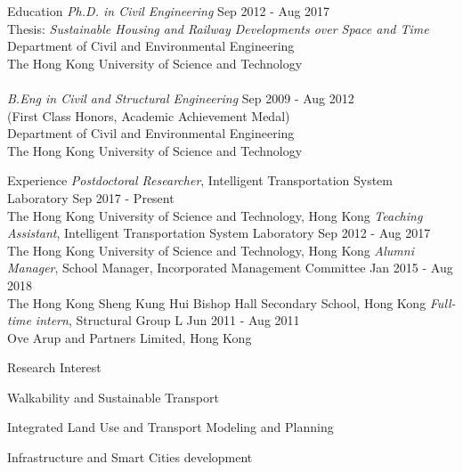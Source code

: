 \documentclass{resume} %
\begin{document}
\begin{rSection}{Education}
\textit{Ph.D. in Civil Engineering} \hfill {Sep 2012 - Aug 2017}\\
Thesis: \textit{Sustainable Housing and Railway Developments over Space and Time}
\smallskip \\
Department of Civil and Environmental Engineering \\
The Hong Kong University of Science and Technology \\
\\
\textit{B.Eng in Civil and Structural Engineering} \hfill
{Sep 2009 - Aug 2012}\\
(First Class Honors, Academic Achievement Medal)\smallskip \\
Department of Civil and Environmental Engineering \\
The Hong Kong University of Science and Technology
\end{rSection}

\begin{rSection}{Experience}
\textit{Postdoctoral Researcher}{, Intelligent Transportation System Laboratory} \hfill {Sep 2017 -
Present}\\
The Hong Kong University of Science and Technology, Hong Kong\smallskip
\textit{Teaching Assistant}{, Intelligent Transportation System Laboratory} \hfill {Sep 2012 - Aug
2017}\\
The Hong Kong University of Science and Technology, Hong Kong\smallskip
\textit{Alumni Manager}{, School Manager, Incorporated Management Committee} \hfill {Jan
2015 - Aug 2018}\\
The Hong Kong Sheng Kung Hui Bishop Hall Secondary School, Hong Kong\smallskip
\textit{Full-time intern}{, Structural Group L} \hfill {Jun 2011 - Aug 2011}\\
Ove Arup and Partners Limited, Hong Kong\smallskip
\end{rSection}

\begin{rSection}{Research Interest}
\itemsep -5pt
\item Walkability and Sustainable Transport
\item Integrated Land Use and Transport Modeling and Planning
\item Infrastructure and Smart Cities development
\end{rSection}
\end{document}
